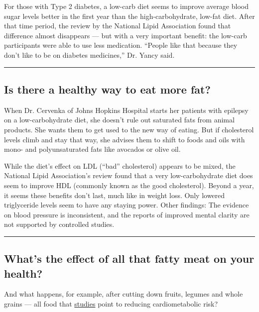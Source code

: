 For those with Type 2 diabetes, a low-carb diet seems to improve average
blood sugar levels better in the first year than the high-carbohydrate,
low-fat diet. After that time period, the review by the National Lipid
Association found that difference almost disappears --- but with a very
important benefit: the low-carb participants were able to use less
medication. ``People like that because they don't like to be on diabetes
medicines,'' Dr. Yancy said.

\begin{center}\rule{0.5\linewidth}{\linethickness}\end{center}

\hypertarget{is-there-a-healthy-way-to-eat-more-fat}{%
\subsection{Is there a healthy way to eat more
fat?}\label{is-there-a-healthy-way-to-eat-more-fat}}

When Dr. Cervenka of Johns Hopkins Hospital starts her patients with
epilepsy on a low-carbohydrate diet, she doesn't rule out saturated fats
from animal products. She wants them to get used to the new way of
eating. But if cholesterol levels climb and stay that way, she advises
them to shift to foods and oils with mono- and polyunsaturated fats like
avocados or olive oil.

While the diet's effect on LDL (``bad'' cholesterol) appears to be
mixed, the National Lipid Association's review found that a very
low-carbohydrate diet does seem to improve HDL (commonly known as the
good cholesterol). Beyond a year, it seems these benefits don't last,
much like in weight loss. Only lowered triglyceride levels seem to have
any staying power. Other findings: The evidence on blood pressure is
inconsistent, and the reports of improved mental clarity are not
supported by controlled studies.

\begin{center}\rule{0.5\linewidth}{\linethickness}\end{center}

\hypertarget{whats-the-effect-of-all-that-fatty-meat-on-your-health}{%
\subsection{What's the effect of all that fatty meat on your
health?}\label{whats-the-effect-of-all-that-fatty-meat-on-your-health}}

And what happens, for example, after cutting down fruits, legumes and
whole grains --- all food that
\href{https://www.ncbi.nlm.nih.gov/pubmed/?term=Mozaffarian+D.+Dietary+and+policy+priorities+for+cardiovascular+disease\%2C+diabetes\%2C+and+obesity\%3A+a+comprehensive+review.+Circulation}{studies}
point to reducing cardiometabolic risk?

